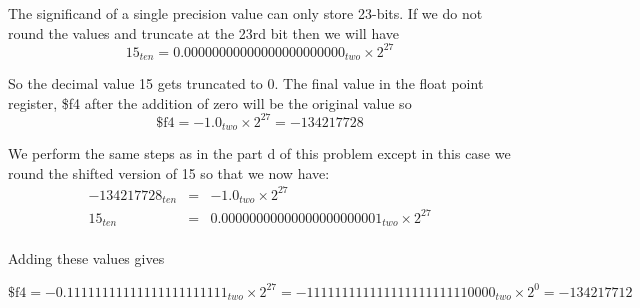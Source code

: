 \documentclass[11pt,reqno]{article}
\begin{document}
The significand of a single precision value can only store 23-bits. If we do not round the values and truncate at the 23rd bit then we will have 
\[ 15_{ten} = 0.00000000 00000000 0000000_{two} \times 2^{27} \]

So the decimal value 15 gets truncated to 0. The final value in the float point register, \$f4 after the addition of zero will be the original value so 
\[ \$\text{f}4 = -1.0_{two} \times 2^{27} = -134217728 \]

\noindent {}

We perform the same steps as in the part d of this problem except in this case we round the shifted version of 15 so that we now have:
 \begin{eqnarray*}
-134217728_{ten} &=& -1.0_{two} \times 2^{27} \\
15_{ten} &=& 0.00000000 00000000 0000001 _{two} \times 2^{27} \\
\end{eqnarray*}

\noindent Adding these values gives

\[ \$\text{f}4 = -0.11111111 11111111 1111111_{two} \times 2^{27} = -11111111 11111111 11111110000_{two} \times 2^0 = -134217712 \]
\end{document}
